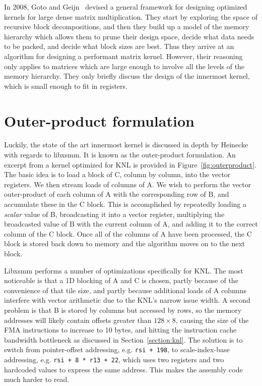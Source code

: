 In 2008, Goto and Geijn~\cite{Goto:2008:AHM:1356052.1356053} devised a general framework for designing optimized kernels for large dense matrix multiplication. They start by exploring the space of recursive block decompositions, and then they build up a model of the memory hierarchy which allows them to prune their design space, decide what data needs to be packed, and decide what block sizes are best. Thus they arrive at an algorithm for designing a performant matrix kernel. However, their reasoning only applies to matrices which are large enough to involve all the levels of the memory hierarchy. They only briefly discuss the design of the innermost kernel, which is small enough to fit in registers. 


\section{Outer-product formulation}

Luckily, the state of the art innermost kernel is discussed in depth by Heinecke~\cite{Heinecke:2016:LAS:3014904.3015017} with regards to libxsmm. It is known as the outer-product formulation. An excerpt from a kernel optimized for KNL is provided in Figure~\ref{fig:outerproduct}. The basic idea is to load a block of C, column by column, into the vector registers. We then stream loads of columns of A. We wish to perform the vector outer-product of each column of A with the corresponding row of B, and accumulate these in the C block. This is accomplished by repeatedly loading a \emph{scalar} value of B, broadcasting it into a vector register, multiplying the broadcasted value of B with the current column of A, and adding it to the correct column of the C block. Once all of the columns of A have been processed, the C block is stored back down to memory and the algorithm moves on to the next block.

Libxsmm performs a number of optimizations specifically for KNL. The most noticeable is that a 1D blocking of A and C is chosen, partly because of the convenience of that tile size, and partly because additional loads of A columns interfere with vector arithmetic due to the KNL's narrow issue width. A second problem is that B is stored by columns but accessed by rows, so the memory addresses will likely contain offsets greater than $128\times 8$, causing the size of the FMA instructions to increase to 10 bytes, and hitting the instruction cache bandwidth bottleneck as discussed in Section~\ref{section:knl}. The solution is to switch from pointer-offset addressing, e.g. \verb|rsi + 198|, to scale-index-base addressing, e.g. \verb|rsi + 8 * r13 + 22|, which uses two registers and two hardcoded values to express the same address. This makes the assembly code much harder to read. 


